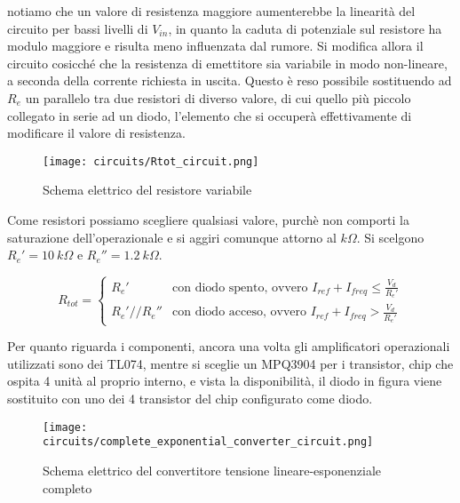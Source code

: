 notiamo che un valore di resistenza maggiore aumenterebbe la linearità del circuito per bassi
livelli di $V_{in}$, in quanto la caduta di potenziale sul resistore ha modulo maggiore e
risulta meno influenzata dal rumore. Si modifica allora il circuito cosicché che la
resistenza di emettitore sia variabile in modo non-lineare, a seconda della corrente
richiesta in uscita. Questo è reso possibile sostituendo ad $R_e$ un parallelo tra due resistori
di diverso valore, di cui quello più piccolo collegato in serie ad un diodo, l'elemento che
si occuperà effettivamente di modificare il valore di resistenza.

\begin{figure}[H]
    \centering
    \texttt{[image: circuits/Rtot\_circuit.png]}
    \caption{Schema elettrico del resistore variabile}
    \label{Rtot_circuit}
\end{figure}

Come resistori possiamo scegliere qualsiasi valore, purchè non comporti la saturazione
dell'operazionale e si aggiri comunque attorno al $k\Omega$. Si scelgono $R_e'=10\ k\Omega$
e $R_e''=1.2\ k\Omega$.

\begin{equation*}
    R_{tot} =
    \left\{
    \begin{array}{lr}
        R_e'        & \text{con diodo spento, ovvero } I_{ref}+I_{freq}\leq\frac{V_d}{R_e'} \\
        R_e'//R_e'' & \text{con diodo acceso, ovvero } I_{ref}+I_{freq}>\frac{V_d}{R_e'}
    \end{array}
    \right.
\end{equation*}

Per quanto riguarda i componenti, ancora una volta gli amplificatori operazionali utilizzati
sono dei TL074, mentre si sceglie un MPQ3904 \cite{mpq3904} per i transistor, chip che
ospita 4 unità al proprio interno, e vista la disponibilità, il diodo in figura viene
sostituito con uno dei 4 transistor del chip configurato come diodo.

\begin{figure}[H]
    \centering
    \texttt{[image: circuits/complete\_exponential\_converter\_circuit.png]}
    \caption{Schema elettrico del convertitore tensione lineare-esponenziale completo}
    \label{complete_exponential_converter_circuit}
\end{figure}


